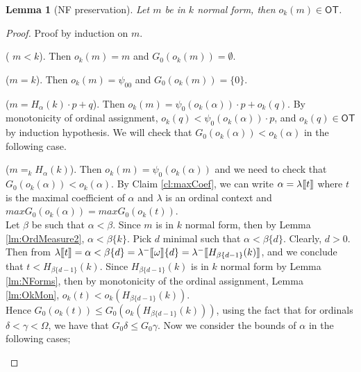 \documentclass{amsart}
\theoremstyle{plain}
\theoremstyle{plain}
\newtheorem{lemma}[theorem]{Lemma}
\def\scbrl{[\hspace{-.14em}[}
\def\scbrr{]\hspace{-.14em}]}
\def\scbr#1{\scbrl#1\scbrr}
\newcommand\OT{\mathsf{OT}}
\newcommand{\Om}{{\Omega}}
\newcommand{\ok}{o_{k}}
\newcommand{\al}{{\alpha}}
\newcommand{\be}{{\beta}}
\newcommand{\ga}{\gamma}
\newcommand{\de}{\delta}
\newcommand{\la}{\lambda}
\newcommand{\om}{\omega}
\def\scbrl{[\hspace{-.14em}[}
\def\scbrr{]\hspace{-.14em}]}
\def\scbr#1{\scbrl#1\scbrr}
\begin{document}
\begin{lemma}[NF preservation]
Let $m$ be in $k$ normal form, then $\ok(m) \in \OT$.
\end{lemma}
\begin{proof}
Proof by induction on $m$.
\begin{Cases}
\item ( $m<k$). Then $\ok(m)=m$ and $G_0(\ok(m))= \emptyset$.
\item ($m = k$). Then $\ok(m) = \psi_00$ and $G_0(\ok(m)) = \{0\}$.
\item ($m= H_\al(k)\cdot p+ q$). Then $\ok(m)=\psi_0(\ok(\al)) \cdot p+ \ok(q)$.
By monotonicity of ordinal assignment, $\ok(q) < \psi_0(\ok(\al))\cdot p$, and $\ok(q)\in \OT$ by induction hypothesis. We will check that $G_0(\ok(\al))< \ok(\al)$ in the following case.

\item ($m=_k H_\al(k)$). Then $\ok(m) = \psi_0(\ok(\al))$ and we need to check that $G_0(\ok(\al))< \ok(\al)$. 
By Claim \ref{cl:maxCoef}, we can write $\al=\la\scbr{t}$ where $t$ is the maximal coefficient of $\al$ and $\la$ is an ordinal context and $max G_0(\ok(\al)) = maxG_0(\ok(t))$.
\medskip
\\
Let $\be$ be such that $\al<\be$. Since $m$ is in $k$ normal form, then by Lemma \ref{lm:OrdMeasure2}, $\al<\be\{k\}$.%
Pick $d$ minimal such that $\al < \be\{d\}$.
Clearly, $d>0$.\medskip\\
Then from $\la\scbr{t}=\al<\be\{d\}=\la^-\scbr{\om}\{d\}=\la^-\scbr{H_{\be\{d-1\}}(k)}$, and we conclude that $t< H_{\be\{d-1\}}(k)$.%
Since $H_{\be\{d-1\}}(k)$  is in $k$ normal form by Lemma \ref{lm:NForms}, then by monotonicity of the ordinal assignment, Lemma \ref{lm:OkMon}, $\ok(t)< \ok(H_{\be\{d-1\}}(k))$.\medskip\\
Hence $G_0(\ok(t))\leq G_0(\ok(H_{\be\{d-1\}}(k)))$,  using the fact that for ordinals $\de<\ga<\Om$, we have that $G_0\de\leq G_0\ga$.
Now we consider the bounds of $\al$ in the following cases;\smallskip


\end{Cases}
\end{proof}
\end{document}
